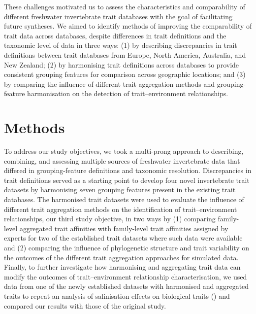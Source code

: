\documentclass[12pt]{article}
\begin{document}
These challenges motivated us to assess the characteristics and comparability of different freshwater invertebrate trait databases with the goal of facilitating future syntheses. We aimed to identify methods of improving the comparability of trait data across databases, despite differences in trait definitions and the taxonomic level of data in three ways: (1) by describing discrepancies in trait definitions between trait databases from Europe, North America, Australia, and New Zealand; (2) by harmonising trait definitions across databases to provide consistent grouping features for comparison across geographic locations; and (3) by comparing the influence of different trait aggregation methods and grouping-feature harmonisation on the detection of trait–environment relationships.


\section*{Methods}

To address our study objectives, we took a multi-prong approach to describing, combining, and assessing multiple sources of freshwater invertebrate data that differed in grouping-feature definitions and taxonomic resolution. Discrepancies in trait definitions served as a starting point to develop four novel invertebrate trait datasets by harmonising seven grouping features present in the existing trait databases. The harmonised trait datasets were used to evaluate the influence of different trait aggregation methods on the identification of trait–environment relationships, our third study objective, in two ways by (1) comparing family-level aggregated trait affinities with family-level trait affinities assigned by experts for two of the established trait datasets where such data were available and (2) comparing the influence of phylogenetic structure and trait variability on the outcomes of the different trait aggregation approaches for simulated data. Finally, to further investigate how harmonising and aggregating trait data can modify the outcomes of trait–environment relationship characterisation, we used data from one of the newly established datasets with harmonised and aggregated traits to repeat an analysis of salinisation effects on biological traits (\cite{szocs_effects_2014}) and compared our results with those of the original study.
\end{document}
